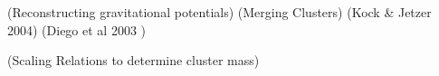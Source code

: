 \documentclass[manuscript]{aastex}
\begin{document}
(Reconstructing gravitational potentials)
(Merging Clusters) 
   (Kock & Jetzer 2004)
   (Diego et al 2003 )
    
(Scaling Relations to determine cluster mass)



\end{document}
